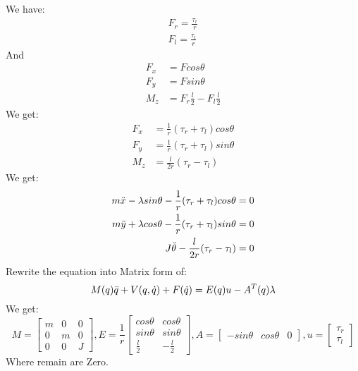We have:
\begin{equation}
	\begin{split}
		F_r = \frac{\tau_r}{r}\\
		F_l = \frac{\tau_l}{r}
	\end{split}
\end{equation}
And
\begin{equation}
	\begin{split}
		F_x &= F cos\theta \\
		F_y &= F sin\theta \\
		M_z &= F_r \frac{l}{2} - F_l \frac{l}{2}
	\end{split}
\end{equation}
We get:
\begin{equation}
	\begin{split}
		F_x &= \frac{1}{r} (\tau_r + \tau_l) cos \theta \\
		F_y &= \frac{1}{r} (\tau_r + \tau_l) sin \theta \\
		M_z &= \frac{l}{2r} (\tau_r - \tau_l)
	\end{split}
\end{equation}
We get:
\begin{equation}
	\begin{split}
		m\Ddot{x} - \lambda sin \theta - \frac{1}{r} (\tau_r + \tau_l) cos \theta = 0\\
		m\Ddot{y} + \lambda cos \theta - \frac{1}{r} (\tau_r + \tau_l) sin \theta = 0\\
		J\Ddot{\theta} - \frac{l}{2r} (\tau_r - \tau_l) = 0
	\end{split}
\end{equation}
Rewrite the equation into Matrix form of:
\[M(q)\Ddot{q} + V (q,\Dot{q}) + F(\Dot{q}) = E(q)u - A^T(q) \lambda\]
We get:
\[M=\begin{bmatrix}
	m & 0 & 0\\
	0 & m & 0\\ 
	0 & 0 & J
\end{bmatrix},
E=\frac{1}{r}
\begin{bmatrix}
	cos\theta & cos\theta \\
	sin\theta & sin\theta \\ 
	\frac{l}{2} & -\frac{l}{2} 
\end{bmatrix},
A=\begin{bmatrix}
	-sin\theta & cos\theta & 0
\end{bmatrix},
u=\begin{bmatrix}
	\tau_r\\
	\tau_l 
\end{bmatrix}\]
Where remain are Zero.

